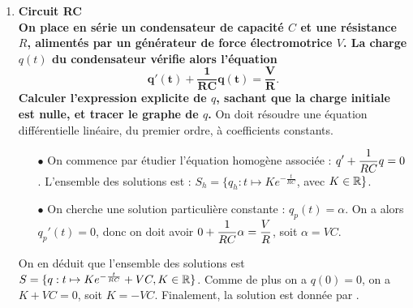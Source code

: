 \documentclass[a4paper, 11pt,reqno]{article}
\begin{document}
\begin{correction} 
\begin{enumerate}
\item \textbf{Circuit RC}\\
\textbf{On place en s\'erie un condensateur de capacit\'e $C$ et une r\'esistance $R$, aliment\'es par un g\'en\'erateur de force \'electromotrice $V$. La charge $q(t)$ du condensateur v\'erifie alors l'\'equation}
$$\mathbf{q'(t) + \frac{1}{RC} q(t) = \frac{V}{R}.}$$
\textbf{Calculer l'expression explicite de $q$, sachant que la charge initiale est nulle, et tracer le graphe de $q$.} On doit r\'esoudre une \'equation diff\'erentielle lin\'eaire, du premier ordre, \`a coefficients constants. 
\begin{itemize}
\item[$\bullet$] On commence par \'etudier l'\'equation homog\`ene associ\'ee : $\displaystyle q' + \frac{1}{RC} q = 0$. L'ensemble des solutions est : $S_h = \{ q_h: t \mapsto  K e^{-\frac{t}{RC}}$, avec $K \in \mathbb{R}\}$.
\item[$\bullet$] On cherche une solution particuli\`ere constante : $q_p(t) = \alpha$. On a alors $q_p'(t) = 0$, donc on doit avoir $0 +\displaystyle \frac{1}{RC} \alpha = \frac{V}{R}$, soit $\alpha = VC$.
\end{itemize}
On en d\'eduit que l'ensemble des solutions est $S = \{q : t\mapsto  K e^{-\frac{t}{RC}}+ VC, K \in \mathbb{R}\}$. Comme de plus on a $q(0) = 0$, on a $K + VC = 0$, soit $K=-VC$. Finalement, la solution est donn\'ee par .
\begin{center}


\end{center}
\end{enumerate}
\end{correction}
\end{document}
